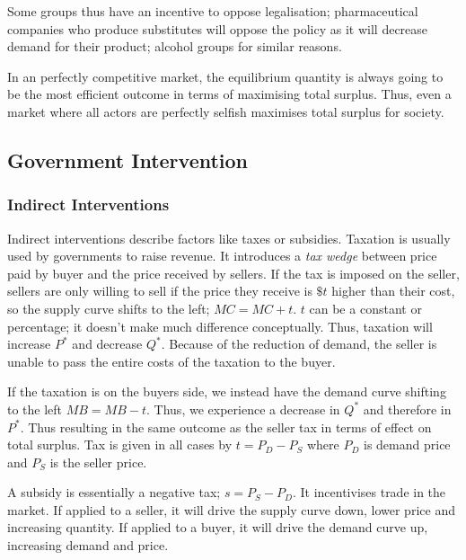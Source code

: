\documentclass[12pt]{report}
\begin{document}
\bigskip
Some groups thus have an incentive to oppose legalisation; pharmaceutical companies who produce substitutes
will oppose the policy as it will decrease demand for their product; alcohol groups for similar reasons.

\bigskip
In an perfectly competitive market, the equilibrium quantity is always going to be the most efficient
outcome in terms of maximising total surplus. Thus, even a market where all actors are perfectly selfish
maximises total surplus for society.

\subsection*{Government Intervention}
\subsubsection*{Indirect Interventions}
Indirect interventions describe factors like taxes or subsidies. Taxation is usually used by governments to
raise revenue. It introduces a \textit{tax wedge} between price paid by buyer and the price received by sellers.
If the tax is imposed on the seller, sellers are only willing to sell if the price they receive is \(\$t\) higher
than their cost, so the supply curve shifts to the left; \(MC = MC + t\). \(t\) can be a constant or percentage;
it doesn't make much difference conceptually. Thus, taxation will increase \(P^*\) and decrease \(Q^*\). Because of 
the reduction of demand, the seller is unable to pass the entire costs of the taxation to the buyer.

\bigskip
If the taxation is on the buyers side, we instead have the demand curve shifting to the left \(MB = MB - t\). Thus,
we experience a decrease in \(Q^*\) and therefore in \(P^*\). Thus resulting in the same outcome as the seller tax 
in terms of effect on total surplus. Tax is given in all cases by \(t = P_D - P_S\) where \(P_D\) is demand price and 
\(P_S\) is the seller price.

\bigskip
A subsidy is essentially a negative tax; \(s = P_S - P_D\). It incentivises trade in the market. If applied to a
seller, it will drive the supply curve down, lower price and increasing quantity. If applied to a buyer, it will 
drive the demand curve up, increasing demand and price.
\end{document}
